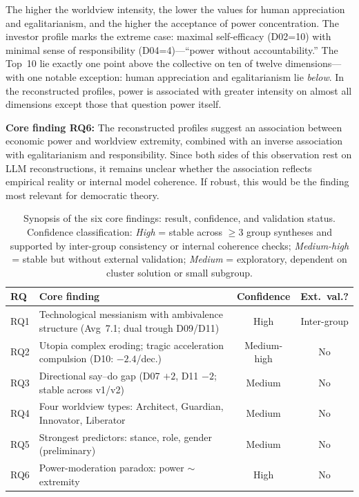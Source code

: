 \documentclass[12pt,a4paper]{article}
\begin{document}
The higher the worldview intensity, the lower the values for human appreciation and egalitarianism, and the higher the acceptance of power concentration. The investor profile marks the extreme case: maximal self-efficacy (D02=10) with minimal sense of responsibility (D04=4)---``power without accountability.'' The Top~10 lie exactly one point above the collective on ten of twelve dimensions---with one notable exception: human appreciation and egalitarianism lie \emph{below}. In the reconstructed profiles, power is associated with greater intensity on almost all dimensions except those that question power itself.

\medskip
\noindent\textbf{Core finding RQ6:} The reconstructed profiles suggest an association between economic power and worldview extremity, combined with an inverse association with egalitarianism and responsibility. Since both sides of this observation rest on LLM reconstructions, it remains unclear whether the association reflects empirical reality or internal model coherence. If robust, this would be the finding most relevant for democratic theory.



\begin{table}[htbp]
  \centering
  \caption{Synopsis of the six core findings: result, confidence, and validation status. Confidence classification: \emph{High} = stable across $\geq 3$ group syntheses and supported by inter-group consistency or internal coherence checks; \emph{Medium-high} = stable but without external validation; \emph{Medium} = exploratory, dependent on cluster solution or small subgroup.}
  \label{tab:synopse}
  \footnotesize
  \begin{tabularx}{\textwidth}{l Y c c}
    \toprule
    \textbf{RQ} & \textbf{Core finding} & \textbf{Confidence} & \textbf{Ext.\ val.?} \\
    \midrule
    RQ1 & Technological messianism with ambivalence structure (Avg~7.1; dual trough D09/D11) & High & Inter-group \\
    \addlinespace[3pt]
    RQ2 & Utopia complex eroding; tragic acceleration compulsion (D10: $-2.4$/dec.) & Medium-high & No \\
    \addlinespace[3pt]
    RQ3 & Directional say--do gap (D07 $+2$, D11 $-2$; stable across v1/v2) & Medium & No \\
    \addlinespace[3pt]
    RQ4 & Four worldview types: Architect, Guardian, Innovator, Liberator & Medium & No \\
    \addlinespace[3pt]
    RQ5 & Strongest predictors: stance, role, gender (preliminary) & Medium & No \\
    \addlinespace[3pt]
    RQ6 & Power-moderation paradox: power $\sim$ extremity & High & No \\
    \bottomrule
  \end{tabularx}
\end{table}
\end{document}
